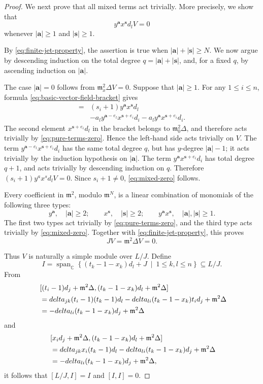 \documentclass[12pt,a4paper]{amsart}
\def\delta{delta}%
\numberwithin{equation}{section}
\def\mm{\mathfrak{m}}
\def\ba{\mathbf{a}}
\def\bs{\mathbf{s}}
\begin{document}
\begin{proof}
We next prove that all mixed terms act trivially. More precisely,
we show that
\begin{equation}\label{eq:mixed-zero}
y^\ba x^\bs d_lV=0
\end{equation}
whenever \(|\ba|\geq1\) and \(|\bs|\geq1\).

By \eqref{eq:finite-jet-property}, the assertion is true when
\(|\ba|+|\bs|\geq N\). We now argue by descending induction on the total
degree
$q=|\ba|+|\bs|$,
and, for a fixed $q$, by ascending induction on \(|\ba|\).

The case \(|\ba|=0\) follows from
\(\mathfrak m_x^2\Delta V=0\). Suppose that \(|\ba|\geq1\).
For any \(1\leq i\leq n\), formula
\eqref{eq:basic-vector-field-bracket} gives
\begin{align*}
[y^\ba d_i,x^{\bs+e_i}d_l]
={}&
(s_i+1)y^\ba x^\bs d_l\\
&-
a_l y^{\ba-e_l}x^{\bs+e_i}d_i
-
a_l y^\ba x^{\bs+e_i}d_i.
\end{align*}
The second element \(x^{\bs+e_i}d_l\) in the bracket
 belongs to \(\mathfrak m_0^2\Delta\), and therefore
acts trivially by \eqref{eq:pure-terms-zero}. Hence the left-hand
side acts trivially on \(V\).
The term
$y^{\ba-e_l}x^{\bs+e_i}d_i$
has the same total degree \(q\), but has \(y\)-degree \(|\ba|-1\);
it acts trivially by the induction hypothesis on \(|\ba|\).
The term $y^\ba x^{\bs+e_i}d_i$
has total degree \(q+1\), and acts trivially by descending induction
on \(q\). Therefore
$(s_i+1)y^ax^sd_lV=0$.
Since \(s_i+1\neq0\),  \eqref{eq:mixed-zero} follows.

Every coefficient in \(\mathfrak m^2\), modulo \(\mathfrak m^N\),
is a linear combination of monomials of the following three types:
\[
y^\ba,\quad |\ba|\geq2;
\qquad
x^\bs,\quad |\bs|\geq2;
\qquad
y^\ba x^\bs,\quad |\ba|,|\bs|\geq1.
\]
The first two types act trivially by
\eqref{eq:pure-terms-zero}, and the third type acts trivially by
\eqref{eq:mixed-zero}. Together with
\eqref{eq:finite-jet-property}, this proves
\begin{equation}\label{eq:J-zero}
JV=\mathfrak m^2\Delta V=0.
\end{equation}

Thus \(V\) is naturally a simple module over \(L/J\). Define
\[
I=
\operatorname{span}_{\mathbb C}
\left\{
(t_k-1-x_k)d_l+J
\ \middle|\
1\leq k,l\leq n
\right\}
\subseteq L/J.
\]
From $$\aligned \
&[(t_i-1)d_j+\mm^2\Delta,(t_k-1-x_k)d_l+\mm^2\Delta]\\
&=\delta_{jk}(t_i-1)(t_k-1)d_l
-\delta_{li}(t_k-1-x_k)t_id_j+\mm^2\Delta\\
&=-\delta_{li}(t_k-1-x_k)d_j+\mm^2\Delta
\endaligned $$
and
$$\aligned \
&[x_id_j+\mm^2\Delta,(t_k-1-x_k)d_l+\mm^2\Delta]\\
&=\delta_{jk}x_i(t_k-1)d_l
-\delta_{li}(t_k-1-x_k)d_j+\mm^2\Delta\\
&=-\delta_{li}(t_k-1-x_k)d_j+\mm^2\Delta,
\endaligned $$
it follows that $[L/J,I]=I$ and $[I,I]=0$.


\end{proof}
\end{document}
